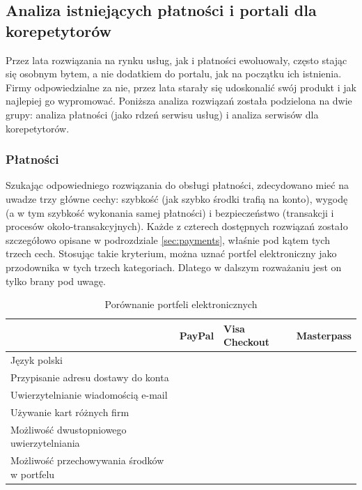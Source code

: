 \documentclass[12pt]{article}
\newcommand{\cmark}{\textcolor{green!80!black}{\ding{51}}}
\newcommand{\xmark}{\textcolor{red}{\ding{55}}}
\numberwithin{figure}{section}
\begin{document}
\begin{sloppypar}
\subsection{Analiza istniejących płatności i portali dla korepetytorów}
Przez lata rozwiązania na rynku usług, jak i płatności ewoluowały, często stając się osobnym bytem, a nie dodatkiem do portalu, jak na początku ich istnienia. Firmy odpowiedzialne za nie, przez lata starały się udoskonalić swój produkt i jak najlepiej go wypromować. Poniższa analiza rozwiązań została podzielona na dwie grupy: analiza płatności (jako rdzeń serwisu usług) i analiza serwisów dla korepetytorów.

\subsubsection{Płatności}
Szukając odpowiedniego rozwiązania do obsługi płatności, zdecydowano mieć na uwadze trzy główne cechy: szybkość (jak szybko środki trafią na konto), wygodę (a w tym szybkość wykonania samej płatności) i bezpieczeństwo (transakcji i procesów około-transakcyjnych). Każde z czterech dostępnych rozwiązań zostało szczegółowo opisane w podrozdziale \ref{sec:payments}, właśnie pod kątem tych trzech cech. Stosując takie kryterium, można uznać portfel elektroniczny jako przodownika w tych trzech kategoriach. Dlatego w dalszym rozważaniu jest on tylko brany pod uwagę.

\begin{table}[htbp]
    \begin{tabular}{|p{5cm}|c|c|c|}
    \hline
     & \multicolumn{1}{l|}{\textbf{PayPal}} & \multicolumn{1}{l|}{\textbf{Visa Checkout}} & \multicolumn{1}{l|}{\textbf{Masterpass}} \\ \hline
    Język polski & \cmark & \cmark & \cmark \\ \hline
    Przypisanie adresu dostawy do konta & \cmark & \cmark & \cmark \\ \hline
    Uwierzytelnianie wiadomością e-mail & \cmark & \cmark & \xmark \\ \hline
    Używanie kart różnych firm & \cmark & \xmark & \xmark \\ \hline
    Możliwość dwustopniowego uwierzytelniania & \cmark & \xmark & \cmark \\ \hline
    Możliwość przechowywania środków w portfelu & \cmark & \xmark & \xmark \\ \hline
    \end{tabular}
    \caption{Porównanie portfeli elektronicznych}
    \label{tab:portfele}
\end{table}


\end{sloppypar}
\end{document}
